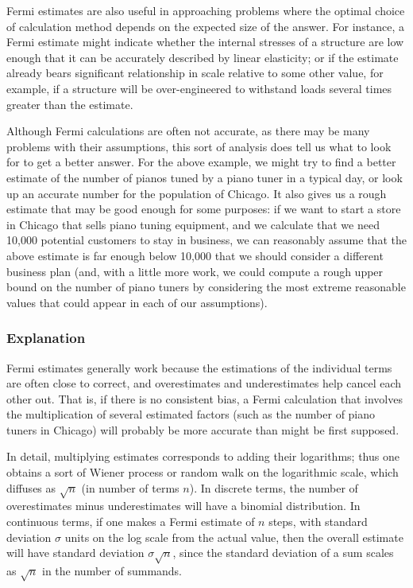 Fermi estimates are also useful in approaching problems where the optimal choice of calculation method depends on the expected size of the answer. For instance, a Fermi estimate might indicate whether the internal stresses of a structure are low enough that it can be accurately described by linear elasticity; or if the estimate already bears significant relationship in scale relative to some other value, for example, if a structure will be over-engineered to withstand loads several times greater than the estimate.

Although Fermi calculations are often not accurate, as there may be many problems with their assumptions, this sort of analysis does tell us what to look for to get a better answer. For the above example, we might try to find a better estimate of the number of pianos tuned by a piano tuner in a typical day, or look up an accurate number for the population of Chicago. It also gives us a rough estimate that may be good enough for some purposes: if we want to start a store in Chicago that sells piano tuning equipment, and we calculate that we need 10,000 potential customers to stay in business, we can reasonably assume that the above estimate is far enough below 10,000 that we should consider a different business plan (and, with a little more work, we could compute a rough upper bound on the number of piano tuners by considering the most extreme reasonable values that could appear in each of our assumptions).


\subsubsection{Explanation}
Fermi estimates generally work because the estimations of the individual terms are often close to correct, and overestimates and underestimates help cancel each other out. That is, if there is no consistent bias, a Fermi calculation that involves the multiplication of several estimated factors (such as the number of piano tuners in Chicago) will probably be more accurate than might be first supposed.

In detail, multiplying estimates corresponds to adding their logarithms; thus one obtains a sort of Wiener process or random walk on the logarithmic scale, which diffuses as $\sqrt{n}$ (in number of terms $n$). In discrete terms, the number of overestimates minus underestimates will have a binomial distribution. In continuous terms, if one makes a Fermi estimate of $n$ steps, with standard deviation $\sigma$ units on the log scale from the actual value, then the overall estimate will have standard deviation $\sigma\sqrt{n}$, since the standard deviation of a sum scales as $\sqrt{n}$ in the number of summands.

